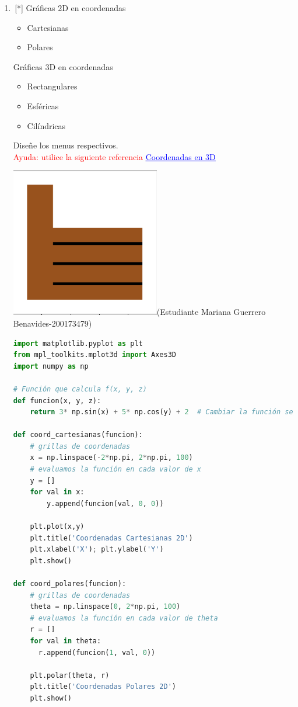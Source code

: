 \begin{enumerate}
\begin{lstlisting}[language=Python]
    \end{lstlisting}
    \item \,[*] Gráficas 2D en coordenadas
    \begin{itemize}
        \item Cartesianas
        \item Polares
    \end{itemize} 
    Gráficas 3D en coordenadas
    \begin{itemize}
        \item Rectangulares
        \item Esféricas
        \item Cilíndricas
    \end{itemize}
    Diseñe los menus respectivos.\\
\textcolor{red}{Ayuda: utilice la siguiente referencia}
\href{https://www.uv.mx/personal/aherrera/files/2014/05/03-Sistemas-de-Coordenadas-en-3D-AHE.pdf}{\textcolor{blue}{\underline{Coordenadas en 3D}}}

\cite{ChatGPT_Graficas}

\includegraphics[width= 10 mm]{figures/exc.png}(Estudiante Mariana Guerrero Benavides-200173479)

\begin{lstlisting}[language=Python]
import matplotlib.pyplot as plt
from mpl_toolkits.mplot3d import Axes3D
import numpy as np

# Función que calcula f(x, y, z)
def funcion(x, y, z):
    return 3* np.sin(x) + 5* np.cos(y) + 2  # Cambiar la función según necesidades

def coord_cartesianas(funcion):
    # grillas de coordenadas
    x = np.linspace(-2*np.pi, 2*np.pi, 100)
    # evaluamos la función en cada valor de x
    y = []
    for val in x:
        y.append(funcion(val, 0, 0))

    plt.plot(x,y)
    plt.title('Coordenadas Cartesianas 2D')
    plt.xlabel('X'); plt.ylabel('Y')
    plt.show()

def coord_polares(funcion):
    # grillas de coordenadas
    theta = np.linspace(0, 2*np.pi, 100)
    # evaluamos la función en cada valor de theta
    r = []
    for val in theta:
      r.append(funcion(1, val, 0))
    
    plt.polar(theta, r)
    plt.title('Coordenadas Polares 2D')
    plt.show()


\end{lstlisting}
\end{enumerate}
